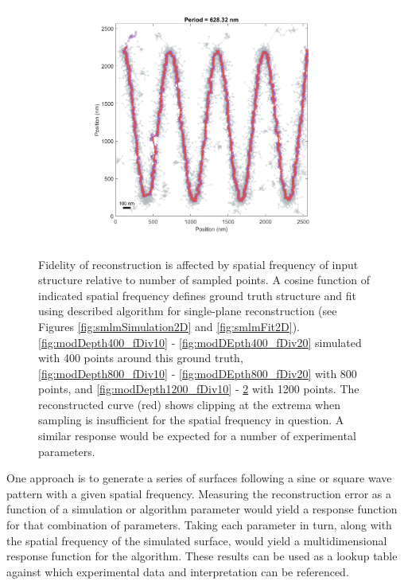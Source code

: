 \documentclass[10pt,a4paper]{article}
\begin{document}
\begin{enumerate}
\begin{figure}
\begin{subfigure}[b]{.3\textwidth}
	\end{subfigure}
	\begin{subfigure}[b]{.3\textwidth}
		\centering
		\includegraphics[width=\textwidth]{./figures/FitPoints2d_pts-1200_period-628.png}
		\caption[Step2]{}
		\label{fig:modDEpth1200_fDiv20}
	\end{subfigure}	

\caption{Fidelity of reconstruction is affected by spatial frequency of input structure relative to number of sampled points. A cosine function of indicated spatial frequency defines ground truth structure and fit using described algorithm for single-plane reconstruction (see Figures \ref{fig:smlmSimulation2D} and \ref{fig:smlmFit2D}). \ref{fig:modDepth400_fDiv10} - \ref{fig:modDEpth400_fDiv20} simulated with 400 points around this ground truth, \ref{fig:modDepth800_fDiv10} - \ref{fig:modDEpth800_fDiv20} with 800 points, and \ref{fig:modDepth1200_fDiv10} - \ref{fig:modDEpth1200_fDiv20} with 1200 points.  The reconstructed curve (red) shows clipping at the extrema when sampling is insufficient for the spatial frequency in question.  A similar response would be expected for a number of experimental parameters. } \end{figure}
	
	
	One approach is to generate a series of surfaces following a sine or square wave pattern with a given spatial frequency.  Measuring the reconstruction error as a function of a simulation or algorithm parameter would yield a response function for that combination of parameters.  Taking each parameter in turn, along with the spatial frequency of the simulated surface, would yield a multidimensional response function for the algorithm.  These results can be used as a lookup table against which experimental data and interpretation can be referenced.
	

\end{enumerate}
\end{document}

